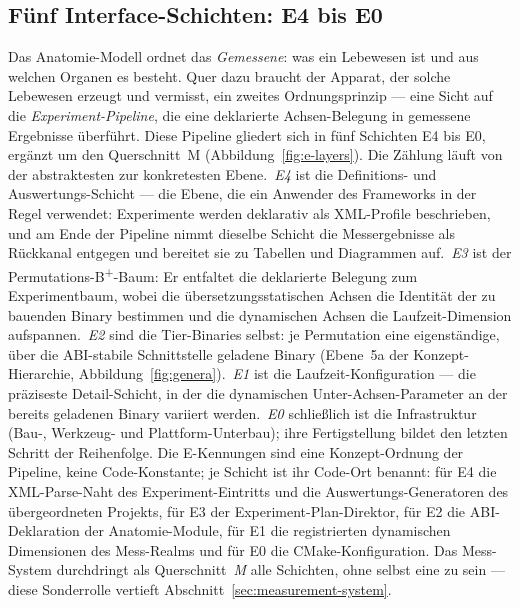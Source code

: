 \begin{nurlang}
\subsection{Fünf Interface-Schichten: E4 bis E0}\label{sec:anatomy-layers}
Das Anatomie-Modell ordnet das \emph{Gemessene}: was ein Lebewesen ist und aus welchen Organen es
besteht. Quer dazu braucht der Apparat, der solche Lebewesen erzeugt und vermisst, ein zweites
Ordnungsprinzip --- eine Sicht auf die \emph{Experiment-Pipeline}, die eine deklarierte Achsen-Belegung
in gemessene Ergebnisse überführt. Diese Pipeline gliedert sich in fünf Schichten E4 bis E0, ergänzt um
den Querschnitt~M (Abbildung~\ref{fig:e-layers}). Die Zählung läuft von der abstraktesten zur
konkretesten Ebene.\ \emph{E4} ist die Definitions- und Auswertungs-Schicht --- die Ebene, die ein
Anwender des Frameworks in der Regel verwendet: Experimente werden deklarativ als XML-Profile
beschrieben, und am Ende der Pipeline nimmt dieselbe Schicht die Messergebnisse als Rückkanal entgegen
und bereitet sie zu Tabellen und Diagrammen auf.\ \emph{E3} ist der
Permutations-B\textsuperscript{+}-Baum: Er entfaltet die deklarierte Belegung zum Experimentbaum, wobei
die übersetzungsstatischen Achsen die Identität der zu bauenden Binary bestimmen und die dynamischen
Achsen die Laufzeit-Dimension aufspannen.\ \emph{E2} sind die Tier-Binaries selbst: je Permutation eine
eigenständige, über die ABI-stabile Schnittstelle geladene Binary (Ebene~5a der Konzept-Hierarchie,
Abbildung~\ref{fig:genera}).\ \emph{E1} ist die Laufzeit-Konfiguration --- die präziseste
Detail-Schicht, in der die dynamischen Unter-Achsen-Parameter an der bereits geladenen Binary variiert
werden.\ \emph{E0} schließlich ist die Infrastruktur (Bau-, Werkzeug- und Plattform-Unterbau); ihre
Fertigstellung bildet den letzten Schritt der Reihenfolge. Die E-Kennungen sind eine Konzept-Ordnung der Pipeline, keine
Code-Konstante; je Schicht ist ihr Code-Ort benannt: für E4 die XML-Parse-Naht des Experiment-Eintritts
und die Auswertungs-Generatoren des übergeordneten Projekts, für E3 der Experiment-Plan-Direktor, für
E2 die ABI-Deklaration der Anatomie-Module, für E1 die registrierten dynamischen Dimensionen des
Mess-Realms und für E0 die CMake-Konfiguration. Das Mess-System durchdringt als Querschnitt~\emph{M}
alle Schichten, ohne selbst eine zu sein --- diese Sonderrolle vertieft Abschnitt~\ref{sec:measurement-system}.
\end{nurlang}
